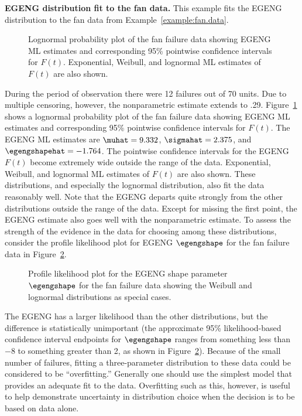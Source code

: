 \begin{example}
{\bf EGENG distribution fit to the fan data.}
This example fits the EGENG distribution to the fan data from
Example~\ref{example:fan.data}.  
\begin{figure}
\caption{Lognormal probability plot of the fan
failure data showing EGENG ML estimates and corresponding 95\% pointwise 
confidence intervals for $F(t)$. Exponential, Weibull, and
lognormal ML estimates of $F(t)$ are also shown.}
\label{figure:fan.egeng.gmleprobplot.ps}
\end{figure}
During the period of observation there were 12 failures
out of 70 units.  Due to multiple censoring, however, the
nonparametric estimate extends to .29. 
Figure~\ref{figure:fan.egeng.gmleprobplot.ps} shows a lognormal
probability plot of the fan failure data showing EGENG ML estimates
and corresponding 95\% pointwise confidence intervals for $F(t)$. 
The EGENG ML estimates are $\muhat=9.332$, $\sigmahat=2.375$, and
$\egengshapehat=-1.764$.  The pointwise confidence intervals for the
EGENG $F(t)$ become extremely wide outside the range of the data.
Exponential, Weibull, and lognormal ML estimates of $F(t)$ are also
shown.  These distributions,
and especially the lognormal distribution, also fit the data
reasonably well. Note that the EGENG departs quite strongly from the
other
distributions outside the range of the data.
Except for missing the first point,
the EGENG estimate also goes well with the nonparametric
estimate. To assess the strength
of the evidence in the data for choosing among these distributions,
consider the profile likelihood plot for EGENG $\egengshape$ for the
fan failure data in Figure~\ref{figure:fan.egeng.delta.profile.ps}.
\begin{figure}
\caption{Profile likelihood plot for the EGENG shape parameter
$\egengshape$ for the fan
failure data showing the Weibull and lognormal distributions as special
cases.}
\label{figure:fan.egeng.delta.profile.ps}
\end{figure}
The EGENG has a larger likelihood than the other distributions, but the
difference is statistically unimportant (the approximate 95\%
likelihood-based confidence interval endpoints for $\egengshape$
ranges from something less than $-8$ to something greater than 2, as
shown in Figure~\ref{figure:fan.egeng.delta.profile.ps}). Because of
the small number of failures, fitting a
three-parameter distribution to these data could be considered to be
``overfitting.''  Generally one should use the simplest model that
provides an adequate fit to the data. Overfitting such as this,
however, is useful to help demonstrate uncertainty 
in distribution choice when
the decision is to be based on data alone.
\end{example}

